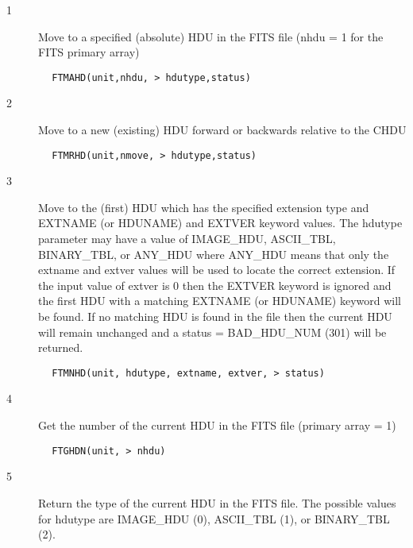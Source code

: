 \documentclass[11pt]{book}
\begin{document}
\begin{description}
\item[1 ] Move to a specified (absolute) HDU in the FITS file (nhdu = 1 for the
   FITS primary array)
\end{description}

\begin{verbatim}
        FTMAHD(unit,nhdu, > hdutype,status)
\end{verbatim}

\begin{description}
\item[2 ]Move to a new (existing) HDU forward or backwards relative to the CHDU
\end{description}

\begin{verbatim}
        FTMRHD(unit,nmove, > hdutype,status)
\end{verbatim}

\begin{description}
\item[3 ] Move to the (first) HDU which has the specified extension type and
    EXTNAME (or HDUNAME) and EXTVER keyword values.  The hdutype parameter
    may have
    a value of IMAGE\_HDU, ASCII\_TBL, BINARY\_TBL, or ANY\_HDU where
    ANY\_HDU means that only the extname and extver values will be
    used to locate the correct extension.  If the input value of
    extver is 0 then the EXTVER keyword is ignored and the first HDU
    with a matching EXTNAME (or HDUNAME) keyword will be found.  If no
    matching HDU is found in the file then the current HDU will remain
    unchanged
   and a status = BAD\_HDU\_NUM (301) will be returned.
\end{description}

\begin{verbatim}
        FTMNHD(unit, hdutype, extname, extver, > status)
\end{verbatim}

\begin{description}
\item[4 ]Get the number of the current HDU in the FITS file (primary array = 1)
\end{description}

\begin{verbatim}
        FTGHDN(unit, > nhdu)
\end{verbatim}

\begin{description}
\item[5 ] Return the type of the current HDU in the FITS file.  The possible
   values for hdutype are IMAGE\_HDU (0), ASCII\_TBL (1), or BINARY\_TBL (2).
\end{description}
\end{document}
